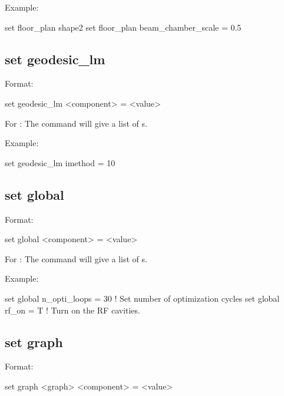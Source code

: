 {{Example:
\begin{example}
  set floor_plan shape2%
  set floor_plan beam_chamber_scale = 0.5
\end{example}


\subsection{set geodesic_lm}
\label{s:set.geodesic.lm}

Format:
\begin{example}
  set geodesic_lm <component> = <value>
\end{example}

For : The  command will give a list of
s.

Example:
\begin{example}
  set geodesic_lm imethod = 10
\end{example}


\subsection{set global}
\label{s:set.global}

Format:
\begin{example}
  set global <component> = <value>
\end{example}

For : The  command will give a list of s.

Example:
\begin{example}
  set global n_opti_loops = 30  ! Set number of optimization cycles
  set global rf_on = T          ! Turn on the RF cavities.
\end{example}


\subsection{set graph}
\label{s:set.graph}

Format:
\begin{example}
  set graph <graph> <component> = <value>
\end{example}

}}
